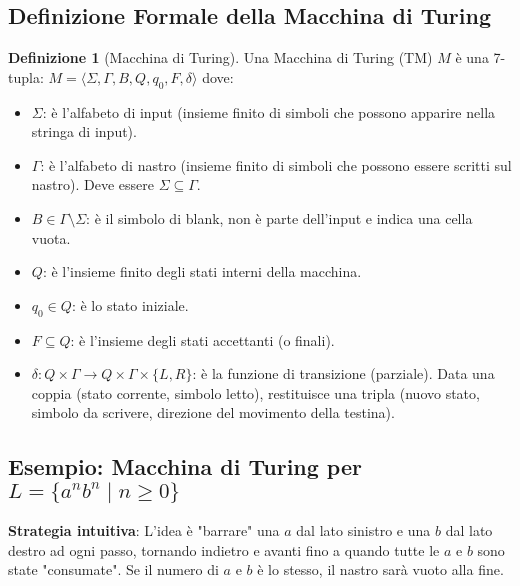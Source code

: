 \documentclass[a4paper]{article}
\theoremstyle{definition} %
\newtheorem{definition}{Definizione}
\begin{document}
\subsection{Definizione Formale della Macchina di Turing}
\begin{definition}[Macchina di Turing]
    Una Macchina di Turing (TM) $M$ è una 7-tupla:
    $M = \langle \Sigma, \Gamma, B, Q, q_0, F, \delta \rangle$
    dove:
    \begin{itemize}
        \item $\Sigma$: è l'alfabeto di input (insieme finito di simboli che possono apparire nella stringa di input).
        \item $\Gamma$: è l'alfabeto di nastro (insieme finito di simboli che possono essere scritti sul nastro). Deve essere $\Sigma \subseteq \Gamma$.
        \item $B \in \Gamma \setminus \Sigma$: è il simbolo di blank, non è parte dell'input e indica una cella vuota.
        \item $Q$: è l'insieme finito degli stati interni della macchina.
        \item $q_0 \in Q$: è lo stato iniziale.
        \item $F \subseteq Q$: è l'insieme degli stati accettanti (o finali).
        \item $\delta: Q \times \Gamma \to Q \times \Gamma \times \{L, R\}$: è la funzione di transizione (parziale). Data una coppia (stato corrente, simbolo letto), restituisce una tripla (nuovo stato, simbolo da scrivere, direzione del movimento della testina).
    \end{itemize}
\end{definition}

\subsection{Esempio: Macchina di Turing per $L = \{a^n b^n \mid n \ge 0\}$}
\textbf{Strategia intuitiva}:
L'idea è "barrare" una $a$ dal lato sinistro e una $b$ dal lato destro ad ogni passo, tornando indietro e avanti fino a quando tutte le $a$ e $b$ sono state "consumate". Se il numero di $a$ e $b$ è lo stesso, il nastro sarà vuoto alla fine.
\end{document}
